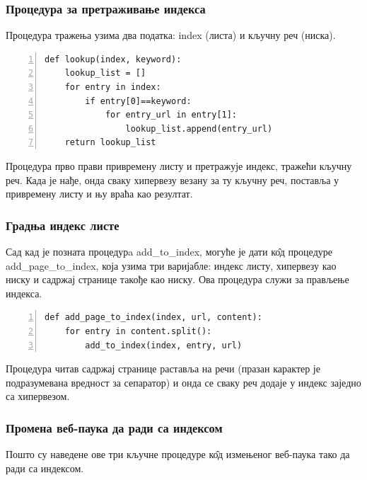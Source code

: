 \subsubsection{Процедура за претраживање индекса}

Процедура тражења узима два податка: index (листа) и кључну реч (ниска).

\begin{lstlisting}[caption=Процедура lookup, label={lst:lookup}, numbers=left]
def lookup(index, keyword):
    lookup_list = []
    for entry in index:
        if entry[0]==keyword:
            for entry_url in entry[1]:
                lookup_list.append(entry_url)
    return lookup_list
		\end{lstlisting}
		Процедура прво прави привремену листу и претражује индекс, тражећи кључну реч. Када је нађе, онда сваку хипервезу везану за ту кључну реч, поставља у привремену листу и њу враћа као резултат.
		\pagebreak
		\subsubsection{Градња индекс листе}
		Сад кад је позната процедурa add\_to\_index, могуће је дати к\^{о}д процедуре add\_page\_to\_index, која узима три варијабле: индекс листу, хипервезу као ниску и садржај странице такође као ниску. Ова процедура служи за прављење индекса.
		\begin{lstlisting}[caption=Процедура add\_page\_to\_index , label={lst:addpagetoindex}, numbers=left]
def add_page_to_index(index, url, content):
    for entry in content.split():
        add_to_index(index, entry, url)
		\end{lstlisting}
		Процедура читав садржај странице раставља на речи (празан карактер је подразумевана вредност за сепаратор) и онда се сваку реч додаје у индекс заједно са хипервезом.
		\subsubsection{Промена веб-паука да ради са индексом}
		Пошто су наведене ове три кључне процедуре к\^{о}д измењеног веб-паука тако да ради са индексом.

